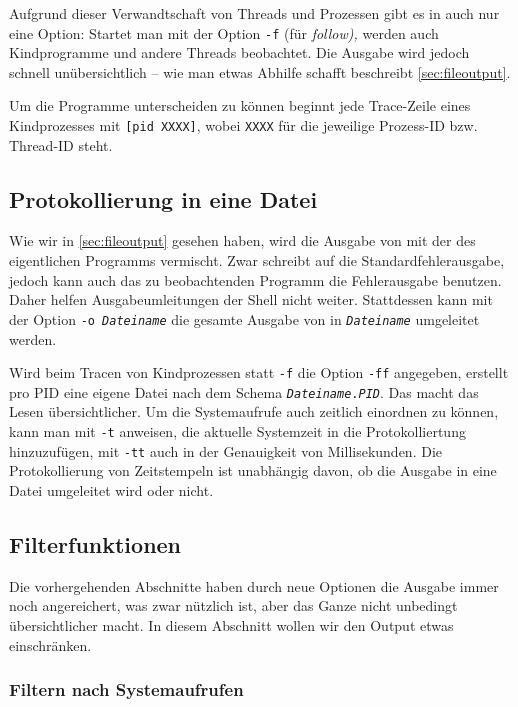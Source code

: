 Aufgrund dieser Verwandtschaft von Threads und Prozessen gibt es in \strace{} auch nur eine Option:
Startet man \strace{} mit der Option \texttt{-f} (für \emph{follow),} werden auch Kindprogramme und
andere Threads beobachtet. Die Ausgabe wird jedoch schnell unübersichtlich -- wie man etwas Abhilfe
schafft beschreibt \autoref{sec:fileoutput}.

Um die Programme unterscheiden zu können beginnt jede Trace-Zeile eines Kindprozesses mit
\texttt{[pid XXXX]}, wobei \texttt{XXXX} für die jeweilige Prozess-ID bzw. Thread-ID steht.


\subsection{Protokollierung in eine Datei}
\label{sec:fileoutput}

Wie wir in \autoref{sec:fileoutput} gesehen haben, wird die Ausgabe von \strace{} mit der des
eigentlichen Programms vermischt. Zwar schreibt \strace{} auf die Standardfehlerausgabe, jedoch
kann auch das zu beobachtenden Programm die Fehlerausgabe benutzen. Daher helfen Ausgabeumleitungen
der Shell nicht weiter. Stattdessen kann mit der Option \texttt{-o \emph{Dateiname}} die gesamte
Ausgabe von \strace{} in \texttt{\emph{Dateiname}} umgeleitet werden.

Wird beim Tracen von Kindprozessen statt \texttt{-f} die Option \texttt{-ff} angegeben, erstellt
\strace{} pro PID eine eigene Datei nach dem Schema \texttt{\emph{Dateiname}.\emph{PID}}. Das macht
das Lesen übersichtlicher. Um die Systemaufrufe auch zeitlich einordnen zu können, kann man
\strace{} mit \texttt{-t} anweisen, die aktuelle Systemzeit in die Protokolliertung hinzuzufügen,
mit \texttt{-tt} auch in der Genauigkeit von Millisekunden. Die Protokollierung von Zeitstempeln
ist unabhängig davon, ob die Ausgabe in eine Datei umgeleitet wird oder nicht.

\subsection{Filterfunktionen}

Die vorhergehenden Abschnitte haben durch neue Optionen die Ausgabe immer noch angereichert, was
zwar nützlich ist, aber das Ganze nicht unbedingt übersichtlicher macht. In diesem Abschnitt wollen
wir den Output etwas einschränken.

\subsubsection{Filtern nach Systemaufrufen}

